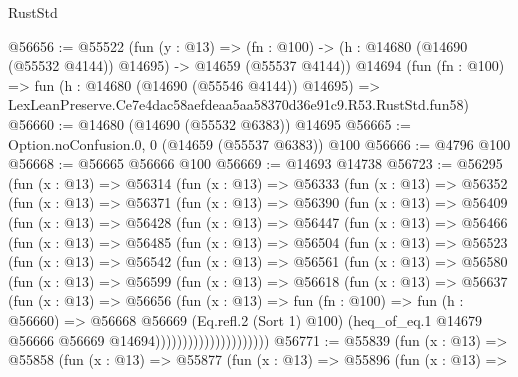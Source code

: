 \begin{lexlean}{RustStd}
\begin{coremodule}
@56656 := @55522
    (fun (y : @13) =>
    (fn : @100) -> (h : @14680 (@14690 (@55532 @4144)) @14695) -> @14659 (@55537 @4144))
    @14694
    (fun (fn : @100) =>
    fun (h : @14680 (@14690 (@55546 @4144)) @14695) =>
    LexLeanPreserve.Ce7e4dac58aefdeaa5aa58370d36e91c9.R53.RustStd.fun58)
@56660 := @14680 (@14690 (@55532 @6383)) @14695
@56665 := Option.noConfusion.{0, 0} (@14659 (@55537 @6383)) @100
@56666 := @4796 @100
@56668 := @56665 @56666 @100
@56669 := @14693 @14738
@56723 := @56295
    (fun (x : @13) =>
    @56314
      (fun (x : @13) =>
      @56333
        (fun (x : @13) =>
        @56352
          (fun (x : @13) =>
          @56371
            (fun (x : @13) =>
            @56390
              (fun (x : @13) =>
              @56409
                (fun (x : @13) =>
                @56428
                  (fun (x : @13) =>
                  @56447
                    (fun (x : @13) =>
                    @56466
                      (fun (x : @13) =>
                      @56485
                        (fun (x : @13) =>
                        @56504
                          (fun (x : @13) =>
                          @56523
                            (fun (x : @13) =>
                            @56542
                              (fun (x : @13) =>
                              @56561
                                (fun (x : @13) =>
                                @56580
                                  (fun (x : @13) =>
                                  @56599
                                    (fun (x : @13) =>
                                    @56618
                                      (fun (x : @13) =>
                                      @56637
                                        (fun (x : @13) =>
                                        @56656
                                          (fun (x : @13) =>
                                          fun (fn : @100) =>
                                          fun (h : @56660) =>
                                          @56668
                                            @56669
                                            (Eq.refl.{2} (Sort 1) @100)
                                            (heq_of_eq.{1}
                                              @14679
                                              @56666
                                              @56669
                                              @14694)))))))))))))))))))))
@56771 := @55839
    (fun (x : @13) =>
    @55858
      (fun (x : @13) =>
      @55877
        (fun (x : @13) =>
        @55896
          (fun (x : @13) =>

\end{coremodule}
\end{lexlean}
